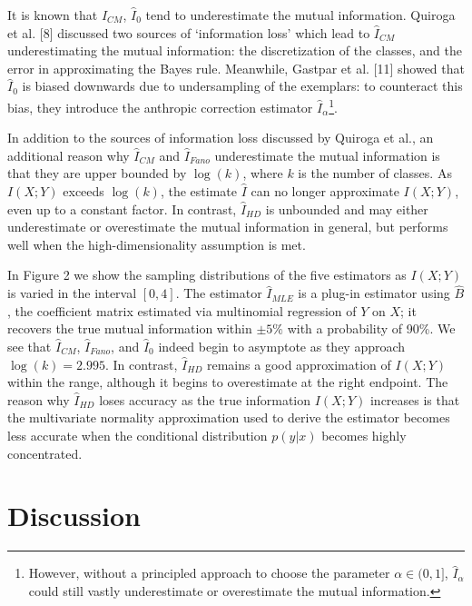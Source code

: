 \documentclass{article}
\begin{document}
It is known that $\hat{I}_{CM}$, $\hat{I}_0$ tend to underestimate the mutual information.
Quiroga et al. [8] discussed two sources of `information loss' which lead to $\hat{I}_{CM}$ underestimating the mutual information:
the discretization of the classes, and the error in approximating the Bayes rule.
Meanwhile, Gastpar et
al. [11] showed that $\hat{I}_0$ is biased downwards due to undersampling
of the exemplars: to counteract this bias, they introduce the
anthropic correction estimator $\hat{I}_\alpha$\footnote{However, without a
principled approach to choose the parameter $\alpha \in (0,1]$,
  $\hat{I}_\alpha$ could still vastly underestimate or overestimate
  the mutual information.}.

In addition to the sources of information loss discussed by Quiroga et al., an additional reason why $\hat{I}_{CM}$ and $\hat{I}_{Fano}$ underestimate the mutual information is that they are upper bounded by $\log(k)$, where $k$ is the number of classes.  As $I(X; Y)$ exceeds $\log(k)$,
the estimate $\hat{I}$ can no longer approximate $I(X; Y)$, even up to
a constant factor.  In contrast, $\hat{I}_{HD}$ is unbounded and 
may either underestimate or overestimate the mutual information in general,
but performs well when the high-dimensionality assumption is met.

In Figure 2 we show the sampling distributions of the five
estimators as $I(X; Y)$ is varied in the interval $[0, 4]$.  The estimator $\hat{I}_{MLE}$
is a plug-in estimator using $\hat{B}$, the coefficient matrix estimated via multinomial regression of $Y$ on $X$;
it recovers the true mutual information within $\pm 5\%$ with a probability of 90\%.
We see that $\hat{I}_{CM}$, $\hat{I}_{Fano}$, and $\hat{I}_0$ indeed begin to
asymptote as they approach $\log(k) = 2.995$.  In contrast,
$\hat{I}_{HD}$ remains a good approximation of $I(X; Y)$ within the
range, although it begins to overestimate at the right endpoint.  
The reason why $\hat{I}_{HD}$ loses accuracy as the true information $I(X; Y)$ increases is that
the multivariate normality approximation used to derive the estimator becomes less accurate when the conditional distribution 
$p(y|x)$ becomes highly concentrated.

\section{Discussion}
\end{document}
